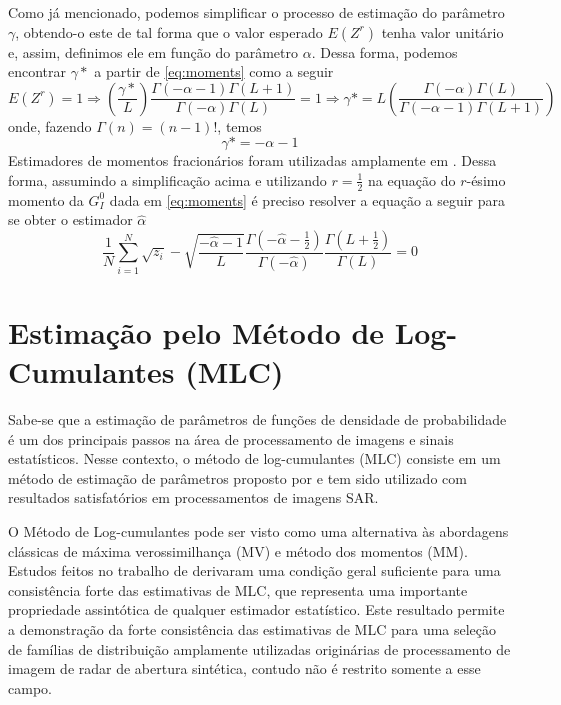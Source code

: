\documentclass[12pt]{article}
\begin{document}
Como já mencionado, podemos simplificar o processo de estimação do parâmetro $\gamma$, obtendo-o este de tal forma que o valor esperado $E(Z^r)$ tenha valor unitário e, assim, definimos ele em função do parâmetro $\alpha$. Dessa forma, podemos encontrar $\gamma*$ a partir de \eqref{eq:moments} como a seguir
\begin{equation}
    E(Z^r) = 1 \Rightarrow \left (\frac{\gamma*}{L}\right ) \frac{\Gamma(-\alpha-1)\Gamma(L+1)}{\Gamma(-\alpha)\Gamma(L)} = 1 \Rightarrow \gamma* = L\left ( \frac{\Gamma(-\alpha)\Gamma(L)}{\Gamma(-\alpha-1)\Gamma(L+1)} \right ) 
\end{equation}
onde, fazendo $\Gamma(n) = (n-1)!$, temos
\begin{equation}
    \gamma* = -\alpha - 1
\end{equation}
Estimadores de momentos fracionários foram utilizadas amplamente em \citet{Clutter1997}. Dessa forma, assumindo a simplificação acima e utilizando $r=\frac{1}{2}$ na equação do $r$-ésimo momento da $G_I^0$ dada em \eqref{eq:moments} é preciso resolver a equação a seguir para se obter o estimador $\hat{\alpha}$
\begin{equation}
    \frac{1}{N}\sum_{i=1}^{N}\sqrt{z_i}-\sqrt{\frac{-\hat{\alpha} - 1}{L}}\frac{\Gamma(-\hat{\alpha} - \frac{1}{2})}{\Gamma(-\hat{\alpha})}\frac{\Gamma(L+\frac{1}{2})}{\Gamma(L)} = 0 \label{fractional_moments}
\end{equation}

\section{Estimação pelo Método de Log-Cumulantes (MLC)}

Sabe-se que a estimação de parâmetros de funções de densidade de probabilidade é um dos principais passos na área de processamento de imagens e sinais estatísticos. Nesse contexto, o método de log-cumulantes (MLC) consiste em um método de estimação de parâmetros proposto por \citet{nicolas2002} e tem sido utilizado com resultados satisfatórios em processamentos de imagens SAR.

O Método de Log-cumulantes pode ser visto como uma alternativa às abordagens clássicas de máxima verossimilhança (MV) e método dos momentos (MM). Estudos feitos no trabalho de \citet{krylov2013} derivaram uma condição geral suficiente para uma consistência forte das estimativas de MLC, que representa uma importante propriedade assintótica de qualquer estimador estatístico. Este resultado permite a demonstração da forte consistência das estimativas de MLC para uma seleção de famílias de distribuição amplamente utilizadas originárias de processamento de imagem de radar de abertura sintética, contudo não é restrito somente a esse campo. 
\end{document}
